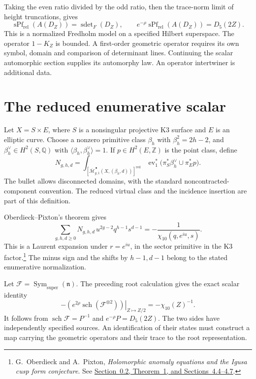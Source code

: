 Taking the even ratio divided by the odd ratio,
then the trace-norm limit of height truncations, gives
\[
 \operatorname{sPf}_{\mathrm{rel}}(A(D_Z))
       =\operatorname{sdet}_F(D_Z),\qquad
 e^{-\rho}\operatorname{sPf}_{\mathrm{rel}}(A(D_Z))=D_5(2Z).
\]
This is a normalized Fredholm model on a specified Hilbert
superspace. The operator \(1-K_Z\) is bounded.
A first-order geometric operator requires its own symbol,
domain and comparison of determinant lines.
Continuing the scalar automorphic section supplies its
automorphy law. An operator intertwiner is additional data.

\section{The reduced enumerative scalar}

Let \(X=S\times E\), where \(S\) is a nonsingular projective
K3 surface and \(E\) is an elliptic curve.
Choose a nonzero primitive class \(\beta_h\) with
\(\beta_h^2=2h-2\), and \(\beta_h^\vee\in H^2(S,\mathbb Q)\)
with \(\langle\beta_h,\beta_h^\vee\rangle=1\).
If \(p\in H^2(E,\mathbb Z)\) is the point class, define
\[
 N_{g,h,d}
  =\int_{[\overline{\mathcal M}^{\,\bullet}_{g,1}
              (X,(\beta_h,d))]^{\mathrm{red}}}
       \operatorname{ev}_1^*
       \bigl(\pi_S^*\beta_h^\vee\cup\pi_E^*p\bigr).
\]
The bullet allows disconnected domains, with the standard
noncontracted-component convention. The reduced virtual class
and the incidence insertion are part of this definition.

Oberdieck--Pixton's theorem gives
\[
 \sum_{g,h,d\geq0}N_{g,h,d}\,u^{2g-2}q^{h-1}s^{d-1}
     =-\frac1{\chi_{10}(q,e^{iu},s)}.
\]
This is a Laurent expansion under \(r=e^{iu}\), in the sector
primitive in the K3 factor.\footnote{
G.~Oberdieck and A.~Pixton,
\emph{Holomorphic anomaly equations and the Igusa cusp form
conjecture}. See \href{https://arxiv.org/abs/1706.10100}
{Section~0.2, Theorem~1, and Sections~4.4--4.7}.}
The minus sign and the shifts by \(h-1,d-1\) belong to the
stated enumerative normalization.

Let \(\mathcal F=\operatorname{Sym}_{\mathrm{super}}(\mathfrak n)\).
The preceding root calculation gives the exact scalar identity
\[
 -\left.(e^{2\rho}\operatorname{sch}(\mathcal F^{\otimes2}))
                      \right|_{Z\mapsto Z/2}
       =-\chi_{10}(Z)^{-1}.
\]
It follows from \(\operatorname{sch}\mathcal F=P^{-1}\) and
\(e^{-\rho}P=D_5(2Z)\).
The two sides have independently specified sources.
An identification of their states must construct a map carrying
the geometric operators and their trace to the root representation.

